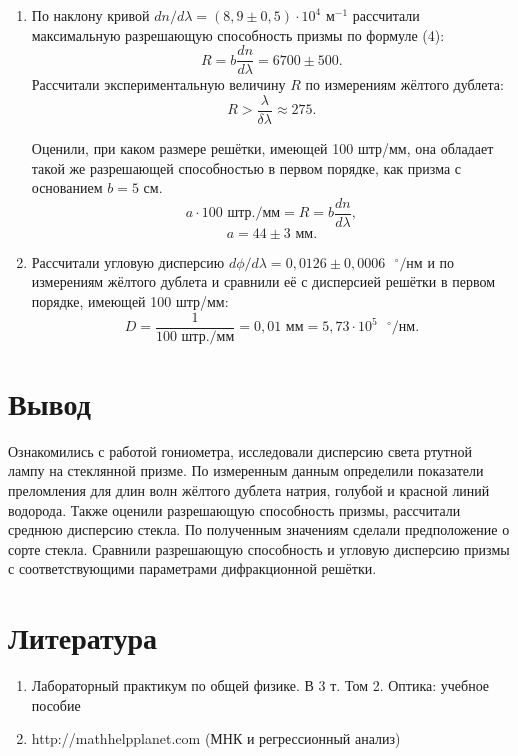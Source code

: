 \documentclass[a4paper, 12pt]{article}%
\begin{document}
\begin{enumerate}
\begin{figure}[h]
\begin{center}
	 	\end{center}
	 \end{figure}
	\item По наклону кривой $dn/d\lambda = (8{,}9\pm0{,}5)\cdot10^{4}\text{ м}^{-1
	}$  рассчитали максимальную разрешающую способность призмы по формуле (4):
	\begin{equation*}
	R = b\dfrac{dn}{d\lambda} = 6700\pm500.
	\end{equation*}
	Рассчитали экспериментальную величину $R$ по измерениям жёлтого дублета:
	\begin{equation*}
	R > \dfrac{\lambda}{\delta\lambda} \approx 275.
	\end{equation*}
	
	Оценили, при каком размере решётки, имеющей 100 штр/мм, она обладает такой же разрешающей способностью в первом порядке, как призма с основанием $b = 5$ см.
	\begin{equation*}
	a\cdot100\text{ штр./мм} = R = b\dfrac{dn}{d\lambda},
	\end{equation*}
	\begin{equation*}
	a = 44\pm3 \text{ мм}.
	\end{equation*}
	\item Рассчитали угловую дисперсию $d\phi/d\lambda = 0{,}0126\pm0{,}0006\text{ }^\circ\text{/нм}$ и по измерениям жёлтого дублета и сравнили её с дисперсией решётки в первом порядке, имеющей 100 штр/мм:
	\begin{equation*}
	D = \dfrac{1}{100\text{ штр./мм}} = 0{,}01\text{ мм} = 5{,}73\cdot10^5\text{ }^\circ\text{/нм}.
	\end{equation*}
\end{enumerate}

\section*{Вывод}
Ознакомились с работой гониометра, исследовали дисперсию света ртутной лампу на стеклянной призме. По измеренным данным определили показатели преломления для длин волн жёлтого дублета натрия, голубой и красной линий водорода. Также оценили разрешающую способность призмы, рассчитали среднюю дисперсию стекла. По полученным значениям сделали предположение о сорте стекла. Сравнили разрешающую способность и угловую дисперсию призмы с соответствующими параметрами дифракционной решётки.

\section{Литература}

\begin{enumerate}

\item Лабораторный практикум по общей физике. В 3 т. Том 2. Оптика: учебное пособие

\item http://mathhelpplanet.com (МНК и регрессионный анализ)


\end{enumerate}	
\end{document}
